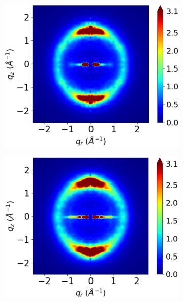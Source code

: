 \documentclass[journal=jpcbfk,manuscript=article]{achemso}
\begin{document}
\begin{figure}[!htb]
  \begin{subfigure}{0.325\linewidth}
  	\centering
  	\includegraphics[width=\textwidth]{rotated_monomers_rzplot_norestraints.pdf}
  	\caption{}\label{fig:rotated_monomers_rzplot_norestraints}
  \end{subfigure}
  \begin{subfigure}{0.325\linewidth}
  	\centering
  	\includegraphics[width=\textwidth]{staggered_rzplot_norestraints.pdf}

\end{subfigure}
\end{figure}
\end{document}
